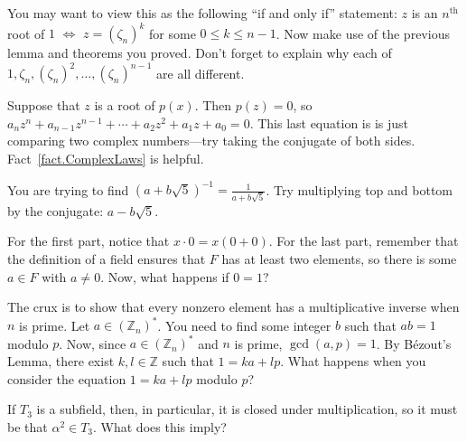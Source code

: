\begin{hint*}
You may want to view this as the following ``if and only if'' statement: $z$ is an $n^\text{th}$ root of $1$ $\iff$ $z = (\zeta_n)^k$ for some $0\le k\le n-1$. Now make use of the previous lemma and theorems you proved. Don't forget to explain why each of $1, \zeta_n, (\zeta_n)^2, \ldots, (\zeta_n)^{n-1}$ are all different.
\end{hint*}

\begin{hint*}
Suppose that $z$ is a root of $p(x)$. Then $p(z) = 0$, so  $a_nz^n + a_{n-1}z^{n-1} +\cdots+a_2z^2+a_1z+a_0 = 0$. This last equation is is just comparing two complex numbers---try taking the conjugate of both sides. Fact~\ref{fact.ComplexLaws} is helpful.
\end{hint*}

\begin{hint*}
You are trying to find $(a+b\sqrt{5})^{-1} = \frac{1}{a+b\sqrt{5}}$. Try multiplying top and bottom by the conjugate: $a-b\sqrt{5}$.
\end{hint*}

\begin{hint*}
For the first part, notice that $x\cdot0 = x(0+0)$. For the last part, remember that the definition of a field ensures that $F$ has at least two elements, so there is some $a\in F$ with $a\neq 0$. Now, what happens if $0=1$?
\end{hint*}

\begin{hint*}
The crux is to show that every nonzero element has a multiplicative inverse when $n$ is prime. Let $a\in (\mathbb{Z}_n)^*$. You need to find some integer $b$ such that $ab=1$ modulo $p$. Now, since $a\in (\mathbb{Z}_n)^*$ and  $n$ is prime, $\gcd(a,p) = 1$. By B\'ezout's Lemma, there exist $k,l\in \mathbb{Z}$ such that $1 = ka+lp$. What happens when you consider the equation $1 = ka+lp$ modulo $p$?
\end{hint*}

\begin{hint*}
If $T_3$ is a subfield, then, in particular, it is closed under multiplication, so it must be that $\alpha^2\in T_3$. What does this imply?
\end{hint*}









